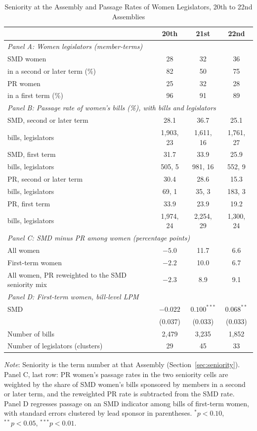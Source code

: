 \documentclass[11pt]{article}
\begin{document}
\begin{table}[htbp]
\centering
\caption{Seniority at the Assembly and Passage Rates of Women Legislators, 20th to 22nd Assemblies}
\label{tab:composition}
\small
\begin{tabular}{p{}ccc}
\toprule
& 20th & 21st & 22nd \\
\midrule
\multicolumn{4}{l}{\textit{Panel A: Women legislators (member-terms)}} \\[3pt]
SMD women & 28 & 32 & 36 \\
\quad in a second or later term (\%) & 82 & 50 & 75 \\
PR women & 25 & 32 & 28 \\
\quad in a first term (\%) & 96 & 91 & 89 \\
\midrule
\multicolumn{4}{l}{\textit{Panel B: Passage rate of women's bills (\%), with bills and legislators}} \\[3pt]
SMD, second or later term & 28.1 & 36.7 & 25.1 \\
\quad bills, legislators & 1,903, 23 & 1,611, 16 & 1,761, 27 \\
SMD, first term & 31.7 & 33.9 & 25.9 \\
\quad bills, legislators & 505, 5 & 981, 16 & 552, 9 \\
PR, second or later term & 30.4 & 28.6 & 15.3 \\
\quad bills, legislators & 69, 1 & 35, 3 & 183, 3 \\
PR, first term & 33.9 & 23.9 & 19.2 \\
\quad bills, legislators & 1,974, 24 & 2,254, 29 & 1,300, 24 \\
\midrule
\multicolumn{4}{l}{\textit{Panel C: SMD minus PR among women (percentage points)}} \\[3pt]
All women & $-5.0$ & 11.7 & 6.6 \\
First-term women & $-2.2$ & 10.0 & 6.7 \\
All women, PR reweighted to the SMD seniority mix & $-2.3$ & 8.9 & 9.1 \\
\midrule
\multicolumn{4}{l}{\textit{Panel D: First-term women, bill-level LPM}} \\[3pt]
SMD & $-0.022$ & $0.100^{***}$ & $0.068^{**}$ \\
 & (0.037) & (0.033) & (0.033) \\
Number of bills & 2,479 & 3,235 & 1,852 \\
Number of legislators (clusters) & 29 & 45 & 33 \\
\bottomrule
\end{tabular}

\vspace{4pt}
\parbox{0.92\textwidth}{\footnotesize \textit{Note}: Seniority is the term number at that Assembly (Section~\ref{sec:seniority}). Panel C, last row: PR women's passage rates in the two seniority cells are weighted by the share of SMD women's bills sponsored by members in a second or later term, and the reweighted PR rate is subtracted from the SMD rate. Panel D regresses passage on an SMD indicator among bills of first-term women, with standard errors clustered by lead sponsor in parentheses. $^*p<0.10$, $^{**}p<0.05$, $^{***}p<0.01$.}
\end{table}
\end{document}
